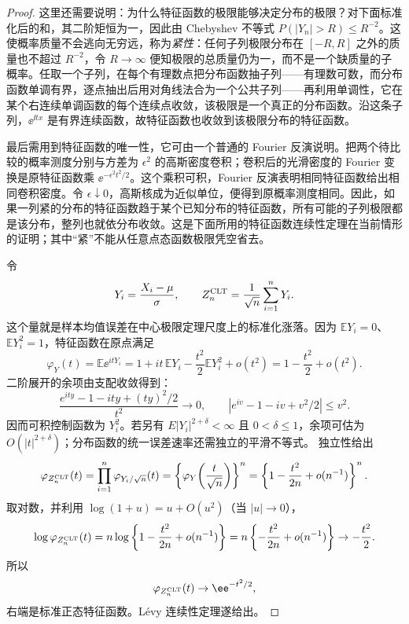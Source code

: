 \begin{proof}
这里还需要说明：为什么特征函数的极限能够决定分布的极限？对下面标准化后的和，其二阶矩恒为一，因此由
Chebyshev 不等式 \(P(|Y_n|>R)\le R^{-2}\)。这使概率质量不会逃向无穷远，称为\emph{紧性}：任何子列极限分布在 \([-R,R]\) 之外的质量也不超过 \(R^{-2}\)，令 \(R\to\infty\) 便知极限的总质量仍为一，而不是一个缺质量的子概率。任取一个子列，在每个有理数点把分布函数抽子列——有理数可数，而分布函数单调有界，逐点抽出后用对角线法合为一个公共子列——再利用单调性，它在某个右连续单调函数的每个连续点收敛，该极限是一个真正的分布函数。沿这条子列，\(\ee^{\ii tx}\) 是有界连续函数，故特征函数也收敛到该极限分布的特征函数。

最后需用到特征函数的唯一性，它可由一个普通的 Fourier 反演说明。把两个待比较的概率测度分别与方差为 \(\epsilon^2\) 的高斯密度卷积；卷积后的光滑密度的 Fourier 变换是原特征函数乘 \(\ee^{-\epsilon^2t^2/2}\)。这个乘积可积，Fourier 反演表明相同特征函数给出相同卷积密度。令 \(\epsilon\downarrow0\)，高斯核成为近似单位，便得到原概率测度相同。因此，如果一列紧的分布的特征函数趋于某个已知分布的特征函数，所有可能的子列极限都是该分布，整列也就依分布收敛。这是下面所用的特征函数连续性定理在当前情形的证明；其中“紧”不能从任意点态函数极限凭空省去。


令
\[
 Y_i=\frac{X_i-\mu}{\sigma},
 \qquad
 Z_n^{\rm CLT}=\frac1{\sqrt n}\sum_{i=1}^nY_i.
\]
这个量就是样本均值误差在中心极限定理尺度上的标准化涨落。因为 $\mathbb E Y_i=0$、$\mathbb E Y_i^2=1$，特征函数在原点满足
\[
 \varphi_Y(t)
 =\mathbb E\ee^{itY_i}
 =1+it\,\mathbb E Y_i-\frac{t^2}{2}\mathbb E Y_i^2+o(t^2)
 =1-\frac{t^2}{2}+o(t^2).
\]
二阶展开的余项由支配收敛得到：
\[
 \frac{e^{ity}-1-ity+(ty)^2/2}{t^2}\longrightarrow0,
 \qquad
 \left|e^{iv}-1-iv+v^2/2\right|\le v^2.
\]
因而可积控制函数为 $Y_i^2$。若另有 $E|Y_i|^{2+\delta}<\infty$ 且 $0<\delta\le1$，余项可估为 $O(|t|^{2+\delta})$；分布函数的统一误差速率还需独立的平滑不等式。
独立性给出
\[
 \varphi_{Z_n^{\rm CLT}}(t)
 =\prod_{i=1}^n\varphi_{Y_i/\sqrt n}(t)
 =\left\{\varphi_Y\!\left(\frac{t}{\sqrt n}\right)\right\}^n
 =\left\{1-\frac{t^2}{2n}+o(n^{-1})\right\}^n.
\]
取对数，并利用 $\log(1+u)=u+O(u^2)$（当 $|u|\to0$），
\[
 \log\varphi_{Z_n^{\rm CLT}}(t)
 =n\log\left\{1-\frac{t^2}{2n}+o(n^{-1})\right\}
 =n\left\{-\frac{t^2}{2n}+o(n^{-1})\right\}
 \to-\frac{t^2}{2}.
\]
所以
\[
 \varphi_{Z_n^{\rm CLT}}(t)\to\ee^{-t^2/2},
\]
右端是标准正态特征函数。L\'evy 连续性定理遂给出。

\end{proof}

